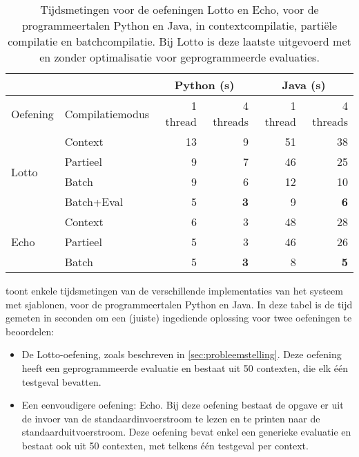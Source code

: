 \begin{table}
    \caption{Tijdsmetingen voor de oefeningen Lotto en Echo, voor de programmeertalen Python en Java, in contextcompilatie, partiële compilatie en batchcompilatie.
    Bij Lotto is deze laatste uitgevoerd met en zonder optimalisatie voor geprogrammeerde evaluaties.}
    \label{tab:meting}
    \centering
    \begin{tabular}{ll|r|r|r|r|}
        \cline{3-6}
        & & \multicolumn{2}{c|}{Python (s)} & \multicolumn{2}{c|}{Java (s)}  \\
        \hline
        \multicolumn{1}{|l|}{Oefening}               & Compilatiemodus  & 1 thread & 4 threads & 1 thread & 4 threads \\
        \hline
        \multicolumn{1}{|l|}{\multirow{4}{*}{Lotto}} & Context          & 13       & 9         & 51       & 38        \\
        \multicolumn{1}{|l|}{}                       & Partieel         & 9        & 7         & 46       & 25        \\
        \multicolumn{1}{|l|}{}                       & Batch            & 9        & 6         & 12       & 10        \\
        \multicolumn{1}{|l|}{}                       & Batch+Eval       & 5        & \textbf{3}         & 9        & \textbf{6}         \\
        \hline
        \multicolumn{1}{|l|}{\multirow{3}{*}{Echo}}  & Context           & 6        & 3         & 48       & 28        \\
        \multicolumn{1}{|l|}{}                       & Partieel          & 5        & 3         & 46       & 26        \\
        \multicolumn{1}{|l|}{}                       & Batch             & 5        & \textbf{3}         & 8        & \textbf{5}         \\
        \hline
    \end{tabular}
\end{table}

 toont enkele tijdsmetingen van de verschillende implementaties van het systeem met sjablonen, voor de programmeertalen Python en Java.
In deze tabel is de tijd gemeten in seconden om een (juiste) ingediende oplossing voor twee oefeningen te beoordelen:

\begin{itemize}
    \item De Lotto-oefening, zoals beschreven in \cref{sec:probleemstelling}.
    Deze oefening heeft een geprogrammeerde evaluatie en bestaat uit 50 contexten, die elk één testgeval bevatten.
    \item Een eenvoudigere oefening: Echo.
    Bij deze oefening bestaat de opgave er uit de invoer van de standaardinvoerstroom te lezen en te printen naar de standaarduitvoerstroom.
    Deze oefening bevat enkel een generieke evaluatie en bestaat ook uit 50 contexten, met telkens één testgeval per context.
\end{itemize}

